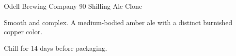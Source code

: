\begin{recipe}{Odell Brewing Company 90 Shilling Ale Clone} %

\begin{aboutblock}
Smooth and complex. A medium-bodied amber ale with a distinct burnished copper
color. \sourceaha
\end{aboutblock}


\begin{methodandtiming}

\begin{mashsteps}
\end{mashsteps}

\begin{fermentationsteps}
\end{fermentationsteps}

\begin{directions}
Chill for 14 days before packaging.
\end{directions}

\end{methodandtiming}

\recipebreak

\begin{ingredientsblock}

\begin{malts}
\end{malts}

\begin{hops}
\end{hops}


\end{ingredientsblock}

\end{recipe}


